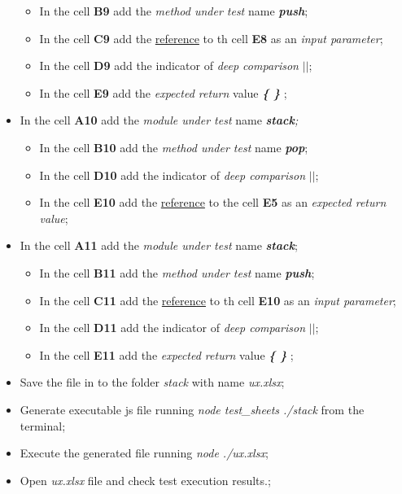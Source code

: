 \begin{itemize}
	\begin{itemize}
		\item In the cell \textbf{B9} add the \textit{method under test} name \textit{\textbf{push}};
		\item In the cell \textbf{C9} add the \underline{reference} to th cell \textbf{E8} as an \textit{input parameter};
		\item In the cell \textbf{D9} add the indicator of\textit{ deep comparison}\textit{ \textbf{$||$}};
		\item In the cell \textbf{E9} add the \textit{expected return} value\textit{ \textbf{ \{ \} }};
	\end{itemize}
%	
	\item In the cell \textbf{A10} add the \textit{module under test} name\textit{\textbf{ stack};}
	\begin{itemize}
		\item In the cell \textbf{B10} add the \textit{method under test} name\textit{ \textbf{ pop}};
		\item In the cell \textbf{D10} add the indicator of \textit{ deep comparison}\textit{ \textbf{$||$}};
		\item In the cell \textbf{E10} add the \underline{reference} to the cell \textbf{E5} as an \textit{expected return value};
	\end{itemize}
%	
	\item In the cell \textbf{A11} add the \textit{module under test} name \textit{\textbf{stack}};
	\begin{itemize}
		\item In the cell \textbf{B11} add the \textit{method under test} name \textit{\textbf{push}};
		\item In the cell \textbf{C11} add the \underline{reference} to th cell \textbf{E10} as an\textit{ input parameter};
		\item In the cell \textbf{D11} add the indicator of \textit{deep comparison}\textit{ \textbf{$||$}};
		\item In the cell \textbf{E11} add the \textit{expected return} value \textit{\textbf{ \{ \} }};
	\end{itemize}
%	
	\item Save the file in to the folder \textit{stack} with name \textit{ux.xlsx};
%	
	\item Generate executable js file running \textit{node test\_sheets ./stack} from the terminal;
%	
	\item Execute the generated file running \textit{node ./ux.xlsx};
	
	\item Open \textit{ux.xlsx} file and check test execution results.;
\end{itemize}

